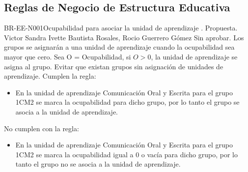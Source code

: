 \subsection{Reglas de Negocio de Estructura Educativa}


\begin{BusinessRule}{BR-EE-N001}{Ocupabilidad para asociar la unidad de aprendizaje}
	{\bcAutorization}    %
	{\btEnabler}     %
	{\blControlling}    %
	.
	\BRItem[Estado] Propuesta.
	 Victor
	 Sandra Ivette Bautista Rosales, Rocio Guerrero Gómez
	 Sin aprobar.
	\BRItem[Descripción] Los grupos se asignarán a una unidad de aprendizaje cuando la ocupabilidad sea mayor que cero.
		\BRItem[Sentencia]  Sea O = Ocupabilidad, si $O>0$, la unidad de aprendizaje se asigna al grupo.
		\BRItem[Motivación] Evitar que existan grupos sin asignación de unidades de aprendizaje.
		 Cumplen la regla:
		\begin{itemize}
			\item En la unidad de aprendizaje Comunicación Oral y Escrita para el grupo 1CM2 se marca la ocupabilidad para dicho grupo, por lo tanto el grupo se asocia a la unidad de aprendizaje.
		\end{itemize}
		 No cumplen con la regla:
		\begin{itemize}
			\item En la unidad de aprendizaje Comunicación Oral y Escrita para el grupo 1CM2 se marca la ocupabilidad igual a 0 o vacía para dicho grupo, por lo tanto el grupo no se asocia a la unidad de aprendizaje.
		\end{itemize}
\end{BusinessRule}

